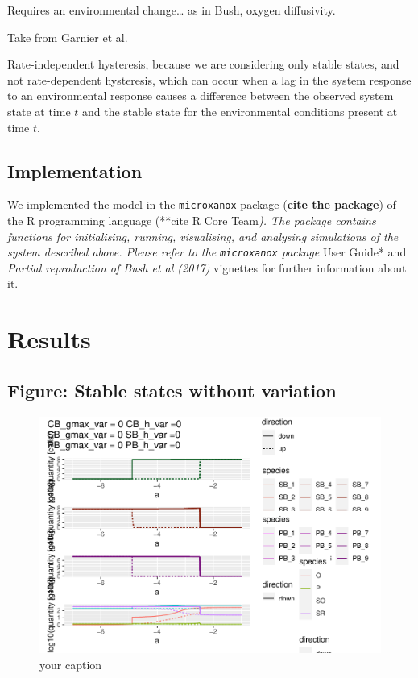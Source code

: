 \documentclass{article}
\begin{document}
Requires an environmental change\ldots{} as in Bush, oxygen diffusivity.

Take from Garnier et al.

Rate-independent hysteresis, because we are considering only stable
states, and not rate-dependent hysteresis, which can occur when a lag in
the system response to an environmental response causes a difference
between the observed system state at time \(t\) and the stable state for
the environmental conditions present at time \(t\).

\hypertarget{implementation}{%
\subsection{Implementation}\label{implementation}}

We implemented the model in the \texttt{microxanox} package
(\textbf{cite the package}) of the R programming language (**cite R Core
Team\emph{). The package contains functions for initialising, running,
visualising, and analysing simulations of the system described above.
Please refer to the \texttt{microxanox} package} User Guide* and
\emph{Partial reproduction of Bush et al (2017)} vignettes for further
information about it.

\hypertarget{results}{%
\section{Results}\label{results}}

\hypertarget{figure-stable-states-without-variation}{%
\subsection{Figure: Stable states without
variation}\label{figure-stable-states-without-variation}}

\begin{figure}

{\centering \includegraphics[width=1\linewidth]{article_files/figure-latex/ss_novar-1} 

}

\caption{your caption}\label{fig:ss_novar}
\end{figure}
\end{document}

